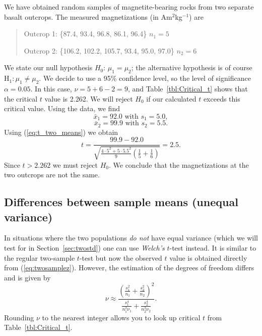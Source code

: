 \begin{example}
We have obtained random samples of 
magnetite-bearing rocks from two separate basalt outcrops.  The measured magnetizations (in Am$^2$kg$^{-1}$) are
\begin{quote}
	Outcrop 1: \{87.4, 93.4, 96.8, 86.1, 96.4\}   $n_1 = 5$

	Outcrop 2: \{106.2, 102.2, 105.7, 93.4, 95.0, 97.0\}   $n_2 = 6$
\end{quote}
We state our null hypothesis $H_0$: $\mu_1 = \mu_2$; the alternative hypothesis is of course H$_1:\mu_1 \neq \mu_2$.  
We decide to use a 95\% confidence level, so the level of significance $\alpha = 0.05$.
In this case, $\nu = 5 + 6 - 2 = 9$, and Table~\ref{tbl:Critical_t}
shows that the critical $t$ value is 2.262.  We will reject $H_0$ if our calculated
$t$ exceeds this critical value.  Using the data, we find
\begin{equation}
\bar{x}_1 = 92.0 \mbox{ with } s_1 = 5.0,
\end{equation}
\begin{equation}
\bar{x}_2 = 99.9 \mbox{ with } s_2 = 5.5.
\end{equation}
Using (\ref{eq:t_two_means}) we obtain
\begin{equation}
t = \frac{99.9 - 92.0}{\sqrt{  \frac{4\cdot 5^2 + 5\cdot5.5^2}{9}  \left(  \frac{1}{5} + \frac{1}{6}   \right) }} = 2.5.
\end{equation}
Since $t > 2.262$ we must reject $H_0$. We conclude that the magnetizations at the two outcrops are 
not the same.
\end{example}

\subsection{Differences between sample means (unequal variance)}
\label{sec:twomeansw}

In situations where the two populations \emph{do not} have equal variance (which we will test for in Section~\ref{sec:twostd}) one
can use \emph{Welch's} $t$-test instead.  It is similar to the regular two-sample $t$-test but now the observed
$t$ value is obtained directly from (\ref{eq:twosamplez}).  However, the estimation of the
degrees of freedom differs and is given by
\begin{equation}
	\displaystyle
	\nu \approx \frac{\left( \frac{s^2_1} {n_1} + \frac{s^2_2}{n_2} \right)^2}{\frac{s^4_1} {n^2_1 \nu_1} + \frac{s^4_2}{n^2_2 \nu_2}}.
\label{eq:Welch2nu}
\end{equation}
Rounding $\nu$ to the nearest integer allows you to look up critical $t$ from Table~\ref{tbl:Critical_t}.

